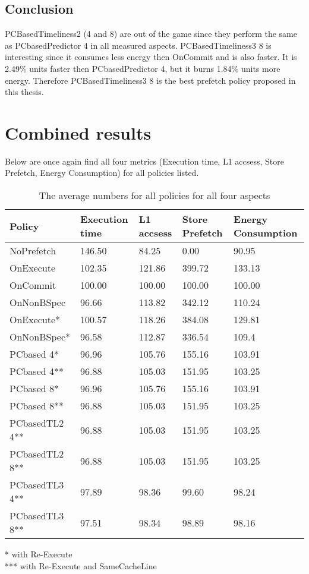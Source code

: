 \subsection{Conclusion}
PCBasedTimeliness2 (4 and 8) are out of the game since they perform the same as PCbasedPredictor 4 in all measured aspects. PCBasedTimeliness3 8 is interesting since it consumes less energy then OnCommit and is also faster. It is 2.49\% units
faster then PCbasedPredictor 4, but it burns 1.84\% units more energy. Therefore
PCBasedTimeliness3 8 is the best prefetch policy proposed in this thesis.

\section{Combined results}
Below are once again find all four metrics (Execution time, L1 accsess, Store Prefetch, Energy Consumption) for all policies listed.
    \begin{table}[H]
\centering

\begin{tabular}{ |l||l|l|l|l| }
\hline
Policy&Execution time & L1 accsess & Store Prefetch & Energy Consumption  \\  \hline \hline
NoPrefetch & 146.50 & 84.25 & 0.00 & 90.95 \\ \hline
OnExecute & 102.35 & 121.86 & 399.72 & 133.13 \\ \hline
OnCommit & 100.00 & 100.00 & 100.00 & 100.00 \\ \hline
OnNonBSpec & 96.66 & 113.82 & 342.12 & 110.24 \\ \hline
OnExecute* & 100.57 & 118.26 & 384.08 & 129.81 \\ \hline
OnNonBSpec* & 96.58 & 112.87 & 336.54 & 109.4 \\ \hline
PCbased 4* & 96.96 & 105.76 & 155.16 & 103.91 \\ \hline
PCbased 4** & 96.88 & 105.03 & 151.95 & 103.25 \\ \hline
PCbased 8* & 96.96 & 105.76 & 155.16 & 103.91 \\ \hline
PCbased 8** & 96.88 & 105.03 & 151.95 & 103.25 \\ \hline
PCbasedTL2 4** & 96.88 & 105.03 & 151.95 & 103.25 \\ \hline
PCbasedTL2 8** & 96.88 & 105.03 & 151.95 & 103.25 \\ \hline
PCbasedTL3 4** & 97.89 & 98.36 & 99.60 & 98.24 \\ \hline
PCbasedTL3 8** & 97.51 & 98.34 & 98.89 & 98.16\\ \hline
 \end{tabular}
 * with Re-Execute \\
*** with Re-Execute and SameCacheLine
\caption{The average numbers for all policies for all four aspects}
\label{Com}
\end{table}